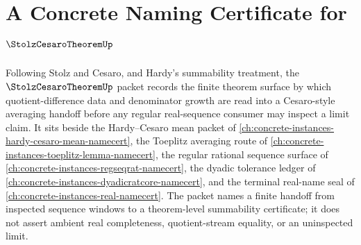 \chapter{A Concrete Naming Certificate for $\StolzCesaroTheoremUp$}
\label{ch:concrete-instances-stolz-cesaro-theorem-namecert}

Following Stolz and Cesaro, and Hardy's summability treatment, the $\StolzCesaroTheoremUp$ packet records the finite theorem surface by which quotient-difference data and denominator growth are read into a Cesaro-style averaging handoff before any regular real-sequence consumer may inspect a limit claim. It sits beside the Hardy--Cesaro mean packet of \autoref{ch:concrete-instances-hardy-cesaro-mean-namecert}, the Toeplitz averaging route of \autoref{ch:concrete-instances-toeplitz-lemma-namecert}, the regular rational sequence surface of \autoref{ch:concrete-instances-regseqrat-namecert}, the dyadic tolerance ledger of \autoref{ch:concrete-instances-dyadicratcore-namecert}, and the terminal real-name seal of \autoref{ch:concrete-instances-real-namecert}. The packet names a finite handoff from inspected sequence windows to a theorem-level summability certificate; it does not assert ambient real completeness, quotient-stream equality, or an uninspected limit.

